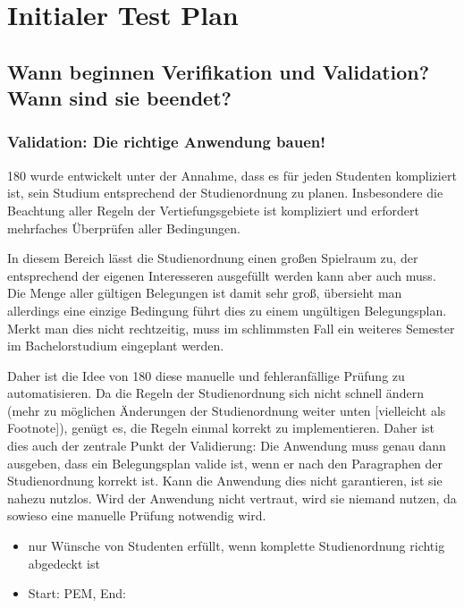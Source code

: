 \documentclass[ngerman]{article}
\begin{document}
\section{Initialer Test Plan}

\subsection{Wann beginnen Verifikation und Validation? Wann sind sie beendet?}

\subsubsection{Validation: Die richtige Anwendung bauen!}

180 wurde entwickelt unter der Annahme, dass es für jeden Studenten
kompliziert ist, sein Studium entsprechend der Studienordnung zu planen.
Insbesondere die Beachtung aller Regeln der Vertiefungsgebiete ist
kompliziert und erfordert mehrfaches Überprüfen aller Bedingungen.

In diesem Bereich lässt die Studienordnung einen großen Spielraum zu, der entsprechend der eigenen Interesseren ausgefüllt werden kann aber auch muss.
Die Menge aller gültigen Belegungen ist damit sehr groß, übersieht man allerdings eine einzige Bedingung führt dies zu einem ungültigen Belegungsplan.
Merkt man dies nicht rechtzeitig, muss im schlimmsten Fall ein weiteres Semester im Bachelorstudium eingeplant werden.

Daher ist die Idee von 180 diese manuelle und fehleranfällige Prüfung zu automatisieren.
Da die Regeln der Studienordnung sich nicht schnell ändern (mehr zu möglichen Änderungen der Studienordnung weiter unten {[}vielleicht als Footnote{]}), genügt es, die Regeln einmal korrekt zu implementieren.
Daher ist dies auch der zentrale Punkt der Validierung:
Die Anwendung muss genau dann ausgeben, dass ein Belegungsplan valide ist, wenn er nach den Paragraphen der Studienordnung korrekt ist.
Kann die Anwendung dies nicht garantieren, ist sie nahezu nutzlos.
Wird der Anwendung nicht vertraut, wird sie niemand nutzen, da sowieso eine manuelle Prüfung notwendig wird.

\begin{itemize}
    \item nur Wünsche von Studenten erfüllt, wenn komplette Studienordnung richtig abgedeckt ist
    \item Start: PEM, End:
\end{itemize}
\end{document}
